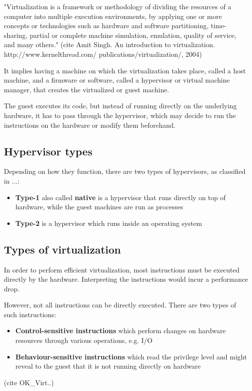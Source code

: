 
"Virtualization is a framework or methodology of dividing the resources of a computer into multiple execution environments, by applying one or more concepts or technologies such as hardware and software partitioning, time-sharing, partial or complete machine simulation, emulation, quality of service, and many others."
(cite Amit Singh. An introduction to virtualization. http://www.kernelthread.com/
publications/virtualization/, 2004)

It implies having a machine on which the virtualization takes place, called a host machine, and a firmware or software, called a hypervisor or virtual machine manager, that creates the virtualized or guest machine.

The guest executes its code, but instead of running directly on the underlying hardware, it has to pass through the hypervisor, which may decide to run the instructions on the hardware or modify them beforehand.

\subsection{Hypervisor types}
\label{subsec:hypertypes}

Depending on how they function, there are two types of hypervisors, as classified in ...:
\begin{itemize}
\item
\textbf{Type-1} also called \textbf{native} is a hypervisor that runs directly on top of hardware, while the guest machines are run as processes
\item
\textbf{Type-2} is a hypervisor which runs inside an operating system
\end{itemize}

\subsection{Types of virtualization}
\label{subsec:typesvirt}

In order to perform efficient virtualization, most instructions must be executed directly by the hardware. Interpreting the instructions would incur a performance drop. 

However, not all instructions can be directly executed. There are two types of such instructions:
\begin{itemize}
\item
\textbf{Control-sensitive instructions} which perform changes on hardware resources through various operations, e.g. I/O
\item
\textbf{Behaviour-sensitive instructions} which read the privilege level and might reveal to the guest that it is not running directly on hardware
\end{itemize}
(cite OK_Virt..)

